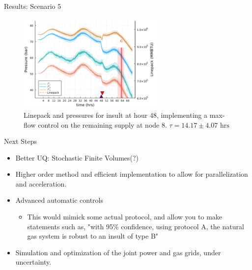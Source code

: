 \documentclass[aspectratio=1610,12pt,dvipsnames]{beamer}
\newcommand{\<}{\langle}
\renewcommand{\>}{\rangle}
\begin{document}
\begin{frame}{Results: Scenario 5}
  \begin{figure}
    \centering
    \includegraphics[width=0.65\textwidth]{ScenarioResults/scen5.png}
    \caption{Linepack and pressures for insult at hour 48, implementing a max-flow control on the remaining supply at node 8. $\tau = 14.17 \pm 4.07 \text{ hrs}$}
  \end{figure}
\end{frame}

\begin{frame}{Next Steps}
  \begin{itemize}
  \item Better UQ: Stochastic Finite Volumes(?)
  \item Higher order method and efficient implementation to allow for parallelization and acceleration.
  \item Advanced automatic controls
    \begin{itemize}
    \item This would mimick some actual protocol, and allow you to make statements such as, "with 95\% confidence, using protocol A, the natural gas system is robust to an insult of type B"
    \end{itemize}
  \item Simulation and optimization of the joint power and gas grids, under uncertainty.
  \end{itemize}
\end{frame}
\end{document}
